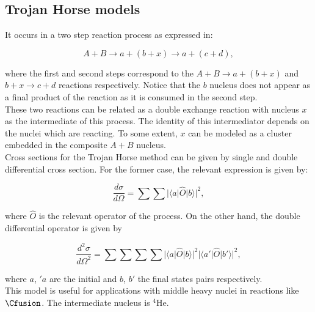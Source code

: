 \documentclass[openany]{book}
\begin{document}
\subsection{Trojan Horse models} \label{sub:special_trojanHorse}

It occurs in a two step reaction process as expressed in:

\begin{equation}\label{eq: special_trojanHorse_reaction}
	A + B \rightarrow a + (b + x)\rightarrow a + (c + d),
\end{equation}

where the first and second steps correspond to the $A + B \rightarrow a + (b + x)$ and $b + x \rightarrow c + d$ reactions respectively. Notice that the $b$ nucleus does not appear as a final product of the reaction as it is consumed in the second step. \\

These two reactions can be related as a double exchange reaction with nucleus $x$ as the intermediate of this process. The identity of this intermediator depends on the nuclei which are reacting. To some extent, $x$ can be modeled as a cluster embedded in the composite $A + B$ nucleus. \\ 

Cross sections for the Trojan Horse method can be given by single and double differential cross section. For the former case, the relevant expression is given by: 

\begin{equation}\label{eq: special_differential_single}
	\frac{d\sigma}{d\Omega} = \sum \sum |\langle a | \hat O | b  \rangle|^2,
\end{equation}

where $\hat O$ is the relevant operator of the process. On the other hand, the double differential operator is given by 

\begin{equation}\label{eq: special_differential_double}
	\frac{d^2\sigma}{d\Omega^2} = \sum \sum \sum \sum  |\langle a | \hat O | b \rangle|^2 |\langle a' | \hat O | b' \rangle|^2,
\end{equation}

where $a$, $'a$ are the initial and $b$, $b'$ the final states pairs respectively. \\

This model is useful for applications with middle heavy nuclei in reactions like $\Cfusion$. The intermediate nucleus is $\mathrm{{}^{4}He}$. \\
\end{document}
